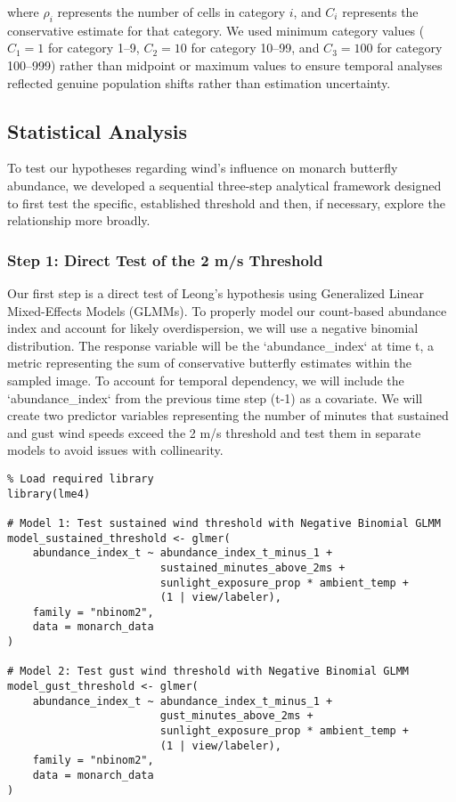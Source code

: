 where $\rho_i$ represents the number of cells in category $i$, and $C_i$ represents the conservative estimate for that category. We used minimum category values ($C_1 = 1$ for category 1–9, $C_2 = 10$ for category 10–99, and $C_3 = 100$ for category 100–999) rather than midpoint or maximum values to ensure temporal analyses reflected genuine population shifts rather than estimation uncertainty.

\subsection{Statistical Analysis}

To test our hypotheses regarding wind's influence on monarch butterfly abundance, we developed a sequential three-step analytical framework designed to first test the specific, established threshold and then, if necessary, explore the relationship more broadly.

\subsubsection{Step 1: Direct Test of the 2 m/s Threshold}

Our first step is a direct test of Leong's hypothesis using Generalized Linear Mixed-Effects Models (GLMMs). To properly model our count-based abundance index and account for likely overdispersion, we will use a negative binomial distribution. The response variable will be the `abundance_index` at time t, a metric representing the sum of conservative butterfly estimates within the sampled image. To account for temporal dependency, we will include the `abundance_index` from the previous time step (t-1) as a covariate. We will create two predictor variables representing the number of minutes that sustained and gust wind speeds exceed the 2 m/s threshold and test them in separate models to avoid issues with collinearity.

\begin{verbatim}
% Load required library
library(lme4)

# Model 1: Test sustained wind threshold with Negative Binomial GLMM
model_sustained_threshold <- glmer(
    abundance_index_t ~ abundance_index_t_minus_1 + 
                        sustained_minutes_above_2ms + 
                        sunlight_exposure_prop * ambient_temp +
                        (1 | view/labeler),
    family = "nbinom2",
    data = monarch_data
)

# Model 2: Test gust wind threshold with Negative Binomial GLMM
model_gust_threshold <- glmer(
    abundance_index_t ~ abundance_index_t_minus_1 + 
                        gust_minutes_above_2ms + 
                        sunlight_exposure_prop * ambient_temp +
                        (1 | view/labeler),
    family = "nbinom2",
    data = monarch_data
)
\end{verbatim}

